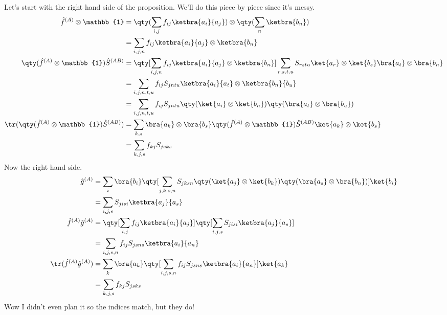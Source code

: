 \documentclass[boxes,pages]{homework}
\makeatletter
\numberwithin{@problem}{section}
\makeatother
\begin{document}
\begin{solution}
	Let's start with the right hand side of the proposition.
	We'll do this piece by piece since it's messy.
	\begin{align*}
		\hat{f}^{(A)}\otimes\mathbb{1}                          & = \qty(\sum_{i, j}f_{ij}\ketbra{a_i}{a_j})\otimes\qty(\sum_n\ketbra{b_n})                                                              \\
		                                                        & = \sum_{i,j,n}f_{ij}\ketbra{a_i}{a_j}\otimes\ketbra{b_n}                                                                               \\
		\qty(\hat{f}^{(A)}\otimes\mathbb{1})\hat{S}^{(AB)}      & = \qty[\sum_{i,j,n}f_{ij}\ketbra{a_i}{a_j}\otimes\ketbra{b_n}]\sum_{r,s,t,u}S_{rstu}\ket{a_r}\otimes\ket{b_s}\bra{a_t}\otimes\bra{b_n} \\
		                                                        & = \sum_{i,j,n,t,u}f_{ij}S_{jntu}\ketbra{a_i}{a_t}\otimes\ketbra{b_n}{b_u}                                                              \\
		                                                        & = \sum_{i,j,n,t,u}f_{ij}S_{jntu}\qty(\ket{a_i}\otimes\ket{b_n})\qty(\bra{a_t}\otimes\bra{b_u})                                         \\
		\tr(\qty(\hat{f}^{(A)}\otimes\mathbb{1})\hat{S}^{(AB)}) & = \sum_{k, s}\bra{a_k}\otimes\bra{b_s}\qty(\hat{f}^{(A)}\otimes\mathbb{1})\hat{S}^{(AB)}\ket{a_k}\otimes\ket{b_s}                      \\
		                                                        & = \sum_{k,j,s}f_{kj}S_{jsks}
	\end{align*}
	Now the right hand side.
	\begin{align*}
		\hat{g}^{(A)}                   & = \sum_{i}\bra{b_i}\qty[\sum_{j,k,s,n}S_{jksn}\qty(\ket{a_j}\otimes\ket{b_k})\qty(\bra{a_s}\otimes\bra{b_n})]\ket{b_i} \\
		                                & = \sum_{i,j,s}S_{jisi}\ketbra{a_j}{a_s}                                                                                \\
		\hat{f}^{(A)}\hat{g}^{(A)}      & = \qty[\sum_{i, j}f_{ij}\ketbra{a_i}{a_j}]\qty[ \sum_{i,j,s}S_{jisi}\ketbra{a_j}{a_s}]                                 \\
		                                & = \sum_{i,j,s,n}f_{ij}S_{jsns}\ketbra{a_i}{a_n}                                                                        \\
		\tr(\hat{f}^{(A)}\hat{g}^{(A)}) & = \sum_k\bra{a_k}\qty[\sum_{i,j,s,n}f_{ij}S_{jsns}\ketbra{a_i}{a_n}]\ket{a_k}                                          \\
		                                & = \sum_{k, j, s}f_{kj}S_{jsks}
	\end{align*}
	Wow I didn't even plan it so the indices match, but they do!
\end{solution}
\end{document}
